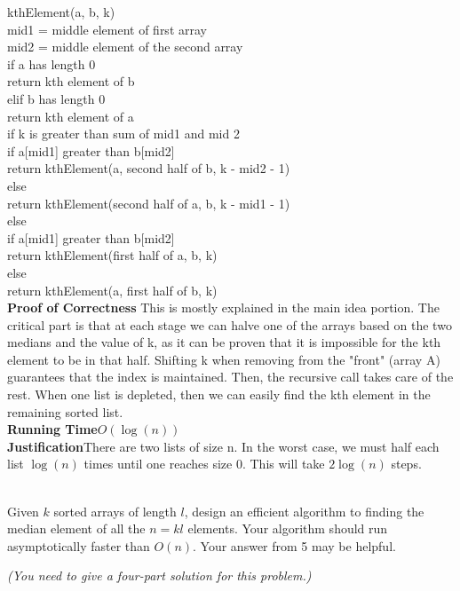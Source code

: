 \begin{qunlist}
{kthElement(a, b, k)\\
\tab mid1 = middle element of first array\\
\tab mid2 = middle element of the second array\\
\tab if a has length 0\\
\tab \tab return kth element of b\\
\tab elif b has length 0\\
\tab \tab return kth element of a\\
\tab \tab if k is greater than sum of mid1 and mid 2\\
\tab \tab \tab if a[mid1] greater than b[mid2]\\
\tab \tab \tab \tab return kthElement(a, second half of b, k - mid2 - 1)\\
\tab \tab \tab else \\
\tab \tab \tab \tab return kthElement(second half of a, b, k - mid1 - 1)\\
\tab \tab else\\
\tab \tab \tab if a[mid1] greater than b[mid2]\\
\tab \tab \tab \tab return kthElement(first half of a, b, k)\\
\tab \tab \tab else \\
\tab \tab \tab \tab return kthElement(a, first half of b, k)\\
\textbf{Proof of Correctness} This is mostly explained in the main idea portion. The critical part is that at each stage we can halve one of the arrays based on the two medians and the value of k, as it can be proven that it is impossible for the kth element to be in that half. Shifting k when removing from the "front" (array A) guarantees that the index is maintained. Then, the recursive call takes care of the rest. When one list is depleted, then we can easily find the kth element in the remaining sorted list. \\
\textbf{Running Time}$O(\log(n))$\\
\textbf{Justification}There are two lists of size n. In the worst case, we must half each list $\log(n)$ times until one reaches size 0. This will take $2\log(n)$ steps.
}

 \\
Given $k$ sorted arrays of length $l$, design an efficient algorithm to finding the median element of all the $n=kl$ elements. Your algorithm should run  asymptotically faster than $O(n)$. Your answer from 5 may be helpful.

{\em (You need to give a four-part solution for this problem.)}

\answer{}


\end{qunlist}
